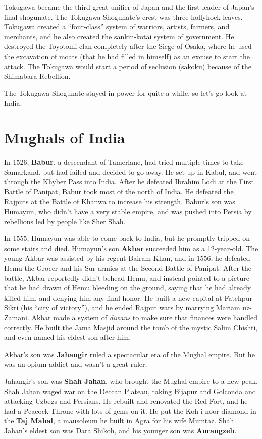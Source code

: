 Tokugawa became the third great unifier of Japan and the first leader of Japan's final shogunate.
The Tokugawa Shogunate's crest was three hollyhock leaves.
Tokugawa created a ``four-class'' system of warriors, artists, farmers, and merchants,
and he also created the sankin-kotai system of government.
He destroyed the Toyotomi clan completely after the Siege of Osaka,
where he used the excavation of moats (that he had filled in himself) as an excuse to start the attack.
The Tokugawa would start a period of seclusion (sakoku) because of the Shimabara Rebellion.

The Tokugawa Shogunate stayed in power for quite a while, so let's go look at India.

\section{Mughals of India}

In 1526, \textbf{Babur}, a descendant of Tamerlane,
had tried multiple times to take Samarkand, but had failed and decided to go away.
He set up in Kabul, and went through the Khyber Pass into India.
After he defeated Ibrahim Lodi at the First Battle of Panipat, Babur took most of the north of India.
He defeated the Rajputs at the Battle of Khanwa to increase his strength.
Babur's son was Humayun, who didn't have a very stable empire,
and was pushed into Persia by rebellions led by people like Sher Shah.

In 1555, Humayun was able to come back to India, but he promptly tripped on some stairs and died.
Humayun's son \textbf{Akbar} succeeded him as a 12-year-old.
The young Akbar was assisted by his regent Bairam Khan,
and in 1556, he defeated Hemu the Grocer and his Sur armies at the Second Battle of Panipat.
After the battle, Akbar reportedly didn't behead Hemu,
and instead pointed to a picture that he had drawn of Hemu bleeding on the ground,
saying that he had already killed him, and denying him any final honor.
He built a new capital at Fatehpur Sikri (his ``city of victory''),
and he ended Rajput wars by marrying Mariam uz-Zamani.
Akbar made a system of \textit{diwans} to make sure that finances were handled correctly.
He built the Jama Masjid around the tomb of the mystic Salim Chishti,
and even named his eldest son after him.

Akbar's son was \textbf{Jahangir} ruled a spectacular era of the Mughal empire.
But he was an opium addict and wasn't a great ruler.

Jahangir's son was \textbf{Shah Jahan}, who brought the Mughal empire to a new peak.
Shah Jahan waged war on the Deccan Plateau, taking Bijapur and Golconda and attacking Uzbegs and Persians.
He rebuilt and renovated the Red Fort, and he had a Peacock Throne with lots of gems on it.
He put the Koh-i-noor diamond in the \textbf{Taj Mahal}, a mausoleum he built in Agra for his wife Mumtaz.
Shah Jahan's eldest son was Dara Shikoh, and his younger son was \textbf{Aurangzeb}.

